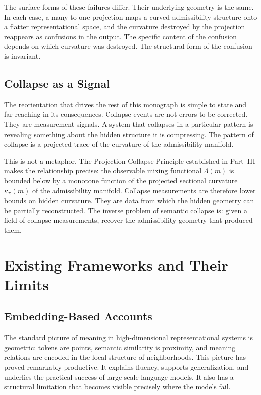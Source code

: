 \documentclass[12pt, oneside]{book}
\theoremstyle{plain-flyxion}
\theoremstyle{definition-flyxion}
\newcommand{\kpi}{\kappa_{\pi}}
\newcommand{\Lam}{\Lambda}
\begin{document}
The surface forms of these failures differ. Their underlying geometry is the same. In each
case, a many-to-one projection maps a curved admissibility structure onto a flatter
representational space, and the curvature destroyed by the projection reappears as
confusions in the output. The specific content of the confusion depends on which curvature
was destroyed. The structural form of the confusion is invariant.

\section{Collapse as a Signal}

The reorientation that drives the rest of this monograph is simple to state and
far-reaching in its consequences. Collapse events are not errors to be corrected. They are
measurement signals. A system that collapses in a particular pattern is revealing
something about the hidden structure it is compressing. The pattern of collapse is a
projected trace of the curvature of the admissibility manifold.

This is not a metaphor. The Projection-Collapse Principle established in Part~III makes
the relationship precise: the observable mixing functional $\Lam(m)$ is bounded below by a
monotone function of the projected sectional curvature $\kpi(m)$ of the admissibility
manifold. Collapse measurements are therefore lower bounds on hidden curvature. They are
data from which the hidden geometry can be partially reconstructed. The inverse problem of
semantic collapse is: given a field of collapse measurements, recover the admissibility
geometry that produced them.

\chapter{Existing Frameworks and Their Limits}

\section{Embedding-Based Accounts}

The standard picture of meaning in high-dimensional representational systems is geometric:
tokens are points, semantic similarity is proximity, and meaning relations are encoded in
the local structure of neighborhoods. This picture has proved remarkably productive. It
explains fluency, supports generalization, and underlies the practical success of
large-scale language models. It also has a structural limitation that becomes visible
precisely where the models fail.
\end{document}

